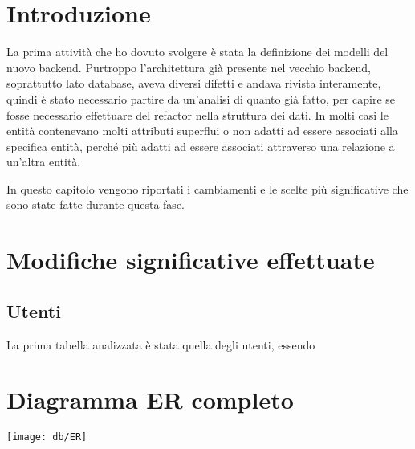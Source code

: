 \section{Introduzione}
La prima attività che ho dovuto svolgere è stata la definizione dei modelli del nuovo backend. Purtroppo l'architettura già presente nel vecchio backend, soprattutto lato database, aveva diversi difetti e andava rivista interamente, quindi è stato necessario partire da un'analisi di quanto già fatto, per capire se fosse necessario effettuare del refactor nella struttura dei dati. In molti casi le entità contenevano molti attributi superflui o non adatti ad essere associati alla specifica entità, perché più adatti ad essere associati attraverso una relazione a un'altra entità.

In questo capitolo vengono riportati i cambiamenti e le scelte più significative che sono state fatte durante questa fase.

\section{Modifiche significative effettuate}
\subsection{Utenti}
La prima tabella analizzata è stata quella degli utenti, essendo 

\section{Diagramma ER completo}
\texttt{[image: db/ER]}